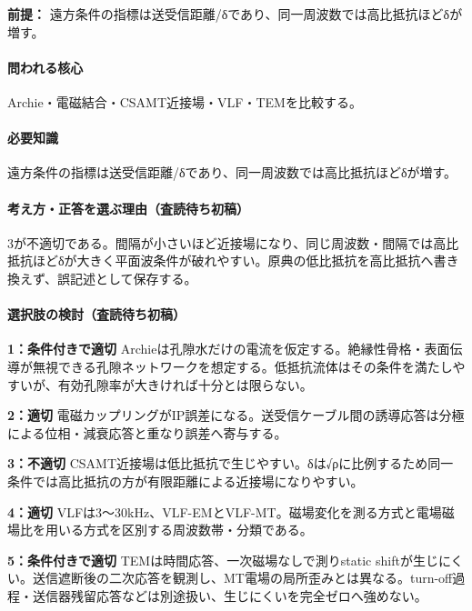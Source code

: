 \noindent\textbf{前提：} 遠方条件の指標は送受信距離/δであり、同一周波数では高比抵抗ほどδが増す。\par

\paragraph{問われる核心} Archie・電磁結合・CSAMT近接場・VLF・TEMを比較する。

\paragraph{必要知識} 遠方条件の指標は送受信距離/δであり、同一周波数では高比抵抗ほどδが増す。

\paragraph{考え方・正答を選ぶ理由（査読待ち初稿）} 3が不適切である。間隔が小さいほど近接場になり、同じ周波数・間隔では高比抵抗ほどδが大きく平面波条件が破れやすい。原典の低比抵抗を高比抵抗へ書き換えず、誤記述として保存する。

\paragraph{選択肢の検討（査読待ち初稿）}\mbox{}\par

\noindent\textbf{1：条件付きで適切} Archieは孔隙水だけの電流を仮定する。絶縁性骨格・表面伝導が無視できる孔隙ネットワークを想定する。低抵抗流体はその条件を満たしやすいが、有効孔隙率が大きければ十分とは限らない。\par

\noindent\textbf{2：適切} 電磁カップリングがIP誤差になる。送受信ケーブル間の誘導応答は分極による位相・減衰応答と重なり誤差へ寄与する。\par

\noindent\textbf{3：不適切} CSAMT近接場は低比抵抗で生じやすい。δは√ρに比例するため同一条件では高比抵抗の方が有限距離による近接場になりやすい。\par

\noindent\textbf{4：適切} VLFは3〜30kHz、VLF-EMとVLF-MT。磁場変化を測る方式と電場磁場比を用いる方式を区別する周波数帯・分類である。\par

\noindent\textbf{5：条件付きで適切} TEMは時間応答、一次磁場なしで測りstatic shiftが生じにくい。送信遮断後の二次応答を観測し、MT電場の局所歪みとは異なる。turn-off過程・送信器残留応答などは別途扱い、生じにくいを完全ゼロへ強めない。\par

